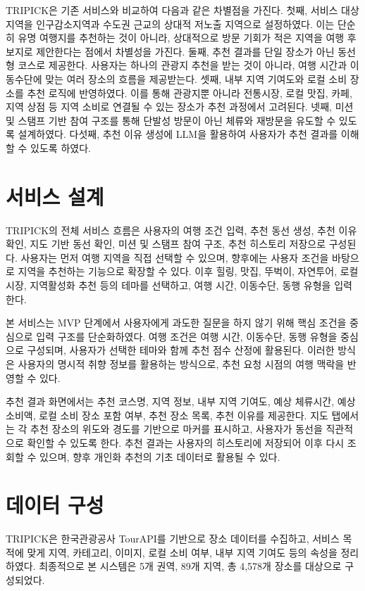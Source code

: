 \documentclass[10pt,a4paper]{article}
\begin{document}
TRIPICK은 기존 서비스와 비교하여 다음과 같은 차별점을 가진다. 첫째, 서비스 대상 지역을 인구감소지역과 수도권 근교의 상대적 저노출 지역으로 설정하였다. 이는 단순히 유명 여행지를 추천하는 것이 아니라, 상대적으로 방문 기회가 적은 지역을 여행 후보지로 제안한다는 점에서 차별성을 가진다. 둘째, 추천 결과를 단일 장소가 아닌 동선형 코스로 제공한다. 사용자는 하나의 관광지 추천을 받는 것이 아니라, 여행 시간과 이동수단에 맞는 여러 장소의 흐름을 제공받는다. 셋째, 내부 지역 기여도와 로컬 소비 장소를 추천 로직에 반영하였다. 이를 통해 관광지뿐 아니라 전통시장, 로컬 맛집, 카페, 지역 상점 등 지역 소비로 연결될 수 있는 장소가 추천 과정에서 고려된다. 넷째, 미션 및 스탬프 기반 참여 구조를 통해 단발성 방문이 아닌 체류와 재방문을 유도할 수 있도록 설계하였다. 다섯째, 추천 이유 생성에 LLM을 활용하여 사용자가 추천 결과를 이해할 수 있도록 하였다.

\section{서비스 설계}

TRIPICK의 전체 서비스 흐름은 사용자의 여행 조건 입력, 추천 동선 생성, 추천 이유 확인, 지도 기반 동선 확인, 미션 및 스탬프 참여 구조, 추천 히스토리 저장으로 구성된다. 사용자는 먼저 여행 지역을 직접 선택할 수 있으며, 향후에는 사용자 조건을 바탕으로 지역을 추천하는 기능으로 확장할 수 있다. 이후 힐링, 맛집, 뚜벅이, 자연투어, 로컬시장, 지역활성화 추천 등의 테마를 선택하고, 여행 시간, 이동수단, 동행 유형을 입력한다.

본 서비스는 MVP 단계에서 사용자에게 과도한 질문을 하지 않기 위해 핵심 조건을 중심으로 입력 구조를 단순화하였다. 여행 조건은 여행 시간, 이동수단, 동행 유형을 중심으로 구성되며, 사용자가 선택한 테마와 함께 추천 점수 산정에 활용된다. 이러한 방식은 사용자의 명시적 취향 정보를 활용하는 방식으로, 추천 요청 시점의 여행 맥락을 반영할 수 있다.

추천 결과 화면에서는 추천 코스명, 지역 정보, 내부 지역 기여도, 예상 체류시간, 예상 소비액, 로컬 소비 장소 포함 여부, 추천 장소 목록, 추천 이유를 제공한다. 지도 탭에서는 각 추천 장소의 위도와 경도를 기반으로 마커를 표시하고, 사용자가 동선을 직관적으로 확인할 수 있도록 한다. 추천 결과는 사용자의 히스토리에 저장되어 이후 다시 조회할 수 있으며, 향후 개인화 추천의 기초 데이터로 활용될 수 있다.

\section{데이터 구성}

TRIPICK은 한국관광공사 TourAPI를 기반으로 장소 데이터를 수집하고, 서비스 목적에 맞게 지역, 카테고리, 이미지, 로컬 소비 여부, 내부 지역 기여도 등의 속성을 정리하였다. 최종적으로 본 시스템은 5개 권역, 89개 지역, 총 4,578개 장소를 대상으로 구성되었다.
\end{document}
